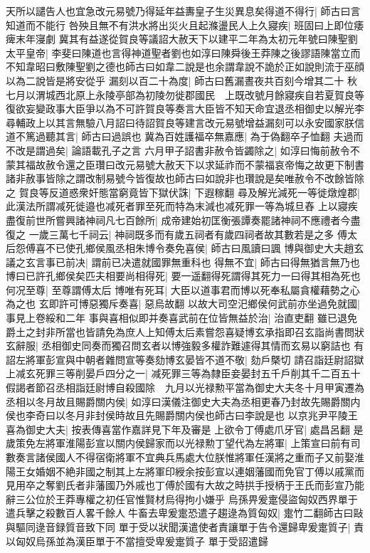 天所以譴告人也宜急改元易號乃得延年益夀皇子生災異息矣得道不得行|{
	師古曰言知道而不能行}
咎殃且無不有洪水將出災火且起滌盪民人上久寢疾|{
	班固曰上即位痿痺末年寖劇}
冀其有益遂從賀良等議詔大赦天下以建平二年為太初元年號曰陳聖劉太平皇帝|{
	李斐曰陳道也言得神道聖者劉也如淳曰陳舜後王莽陳之後謬語陳當立而不知韋昭曰敷陳聖劉之德也師古曰如韋二說是也余謂韋說不詭於正如說則流于巫顔以為二說皆是將安從乎}
漏刻以百二十為度|{
	師古曰舊漏晝夜共百刻今增其二十}
秋七月以渭城西北原上永陵亭部為初陵勿徙郡國民　上既改號月餘寢疾自若夏賀良等復欲妄變政事大臣爭以為不可許賀良等奏言大臣皆不知天命宜退丞相御史以解光李尋輔政上以其言無驗八月詔曰待詔賀良等建言改元易號增益漏刻可以永安國家朕信道不篤過聽其言|{
	師古曰過誤也}
冀為百姓護福卒無嘉應|{
	為于偽翻卒子恤翻}
夫過而不改是謂過矣|{
	論語載孔子之言}
六月甲子詔書非赦令皆蠲除之|{
	如淳曰悔前赦令不蒙其福故赦令還之臣瓚曰改元易號大赦天下以求延祚而不蒙福哀帝悔之故更下制書諸非赦事皆除之謂改制易號今皆復故也師古曰如說非也瓚說是矣唯赦令不改餘皆除之}
賀良等反道惑衆奸態當窮竟皆下獄伏誅|{
	下遐稼翻}
尋及解光減死一等徙燉煌郡|{
	此漢法所謂减死徙邉也减死者罪至死而特為末減也减死罪一等為城旦舂}
上以寢疾盡復前世所嘗興諸神祠凡七百餘所|{
	成帝建始初匡衡張譚奏罷諸神祠不應禮者今盡復之}
一歲三萬七千祠云|{
	神祠既多而有歲五祠者有歲四祠者故其數若是之多}
傅太后怨傅喜不已使孔鄉侯風丞相朱博令奏免喜侯|{
	師古曰風讀曰諷}
博與御史大夫趙玄議之玄言事已前决|{
	謂前已决遣就國罪無重科也}
得無不宜|{
	師古曰得無猶言無乃也}
博曰已許孔鄉侯矣匹夫相要尚相得死|{
	要一遥翻得死謂得其死力一曰得其相為死也}
何况至尊|{
	至尊謂傅太后}
博唯有死耳|{
	大臣以道事君而博以死奉私屬貪權藉勢之心為之也}
玄即許可博惡獨斥奏喜|{
	惡烏故翻}
以故大司空汜鄉侯何武前亦坐過免就國|{
	事見上卷綏和二年}
事與喜相似即并奏喜武前在位皆無益於治|{
	治直吏翻}
雖已退免爵土之封非所當也皆請免為庶人上知傅太后素嘗怨喜疑博玄承指即召玄詣尚書問狀玄辭服|{
	丞相御史同奏而獨召問玄者以博強毅多權詐難遽得其情而玄易以窮詰也}
有詔左將軍彭宣與中朝者雜問宣等奏劾博玄晏皆不道不敬|{
	劾戶槩切}
請召詣廷尉詔獄上减玄死罪三等削晏戶四分之一|{
	减死罪三等為隸臣妾晏封五千戶削其千二百五十}
假謁者節召丞相詣廷尉博自殺國除　九月以光禄勲平當為御史大夫冬十月甲寅遷為丞相以冬月故且賜爵關内侯|{
	如淳曰漢儀注御史大夫為丞相更春乃封故先賜爵關内侯也李奇曰以冬月非封侯時故且先賜爵關内侯也師古曰李說是也}
以京兆尹平陵王喜為御史大夫|{
	按表傳喜當作嘉詳見下年及審是}
上欲令丁傅處爪牙官|{
	處昌呂翻}
是歲策免左將軍淮陽彭宣以關内侯歸家而以光禄勲丁望代為左將軍|{
	上策宣曰前有司數奏言諸侯國人不得宿衛將軍不宜典兵馬處大位朕惟將軍任漢將之重而子又前娶淮陽王女婚姻不絶非國之制其上左將軍印綬余按彭宣以連姻藩國而免官丁傅以戚黨而見用卒之奪劉氏者非藩國乃外戚也丁傅於國有大故之時拱手授柄于王氏而彭宣乃能辭三公位於王莽專權之初任官惟賢材烏得拘小嫌乎}
烏孫畀爰疐侵盜匈奴西界單于遣兵擊之殺數百人畧千餘人牛畜去卑爰疐恐遣子趨逯為質匈奴|{
	疐竹二翻師古曰敺與驅同逯音録質音致下同}
單于受以狀聞漢遣使者責讓單于告令還歸卑爰疐質子|{
	責以匈奴烏孫並為漢臣單于不當擅受卑爰疐質子}
單于受詔遣歸

